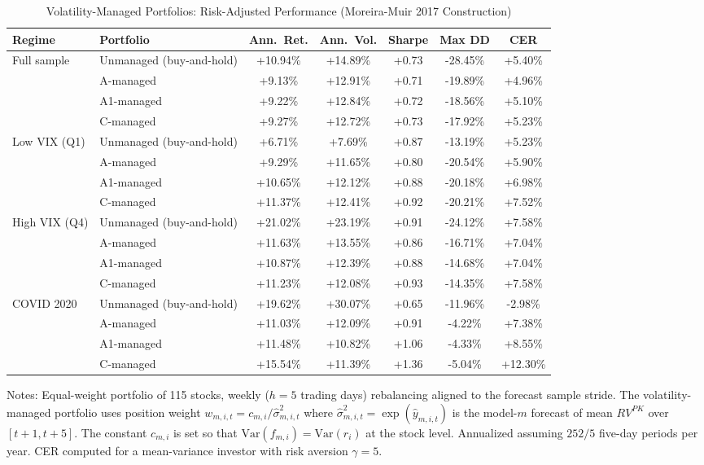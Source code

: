
\begin{table}[htbp]
\centering
\caption{Volatility-Managed Portfolios: Risk-Adjusted Performance (Moreira-Muir 2017 Construction)}
\label{tab:volmanaged}
\small
\begin{tabular}{llccccc}
\toprule
Regime & Portfolio & Ann.\ Ret. & Ann.\ Vol. & Sharpe & Max DD & CER \\
\midrule
Full sample & Unmanaged (buy-and-hold) & +10.94\% & +14.89\% & +0.73 & -28.45\% & +5.40\% \\
 & A-managed & +9.13\% & +12.91\% & +0.71 & -19.89\% & +4.96\% \\
 & A1-managed & +9.22\% & +12.84\% & +0.72 & -18.56\% & +5.10\% \\
 & C-managed & +9.27\% & +12.72\% & +0.73 & -17.92\% & +5.23\% \\
\midrule
Low VIX (Q1) & Unmanaged (buy-and-hold) & +6.71\% & +7.69\% & +0.87 & -13.19\% & +5.23\% \\
 & A-managed & +9.29\% & +11.65\% & +0.80 & -20.54\% & +5.90\% \\
 & A1-managed & +10.65\% & +12.12\% & +0.88 & -20.18\% & +6.98\% \\
 & C-managed & +11.37\% & +12.41\% & +0.92 & -20.21\% & +7.52\% \\
\midrule
High VIX (Q4) & Unmanaged (buy-and-hold) & +21.02\% & +23.19\% & +0.91 & -24.12\% & +7.58\% \\
 & A-managed & +11.63\% & +13.55\% & +0.86 & -16.71\% & +7.04\% \\
 & A1-managed & +10.87\% & +12.39\% & +0.88 & -14.68\% & +7.04\% \\
 & C-managed & +11.23\% & +12.08\% & +0.93 & -14.35\% & +7.58\% \\
\midrule
COVID 2020 & Unmanaged (buy-and-hold) & +19.62\% & +30.07\% & +0.65 & -11.96\% & -2.98\% \\
 & A-managed & +11.03\% & +12.09\% & +0.91 & -4.22\% & +7.38\% \\
 & A1-managed & +11.48\% & +10.82\% & +1.06 & -4.33\% & +8.55\% \\
 & C-managed & +15.54\% & +11.39\% & +1.36 & -5.04\% & +12.30\% \\
\midrule
\bottomrule
\end{tabular}
\begin{tablenotes}\small
\item Notes: Equal-weight portfolio of 115 stocks, weekly ($h=5$ trading days) rebalancing aligned to the forecast sample stride. The volatility-managed portfolio uses position weight $w_{m,i,t} = c_{m,i} / \hat\sigma^2_{m,i,t}$ where $\hat\sigma^2_{m,i,t} = \exp(\hat y_{m,i,t})$ is the model-$m$ forecast of mean $RV^{PK}$ over $[t+1, t+5]$. The constant $c_{m,i}$ is set so that $\mathrm{Var}(f_{m,i}) = \mathrm{Var}(r_i)$ at the stock level. Annualized assuming $252/5$ five-day periods per year. CER computed for a mean-variance investor with risk aversion $\gamma = 5$.
\end{tablenotes}
\end{table}

